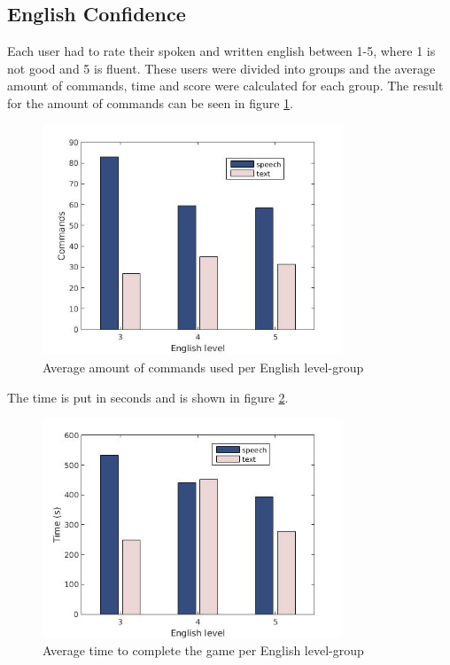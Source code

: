 \subsection{English Confidence} \label{sec:eng_con}
Each user had to rate their spoken and written english between 1-5, where 1 is not good and 5 is fluent. These users were divided into groups and the average amount of commands, time and score were calculated for each group. The result for the amount of commands can be seen in figure \ref{eng_cmd}. 
\begin{figure}[ht]
  \centering
  \includegraphics[width=0.8\textwidth]{images/english_cmd.jpg}
  \caption{Average amount of commands used per English level-group}\label{eng_cmd}
\end{figure}
The time is put in seconds and is shown in figure \ref{eng_time}.
\begin{figure}[ht]
  \centering
  \includegraphics[width=0.8\textwidth]{images/english_time.jpg}
  \caption{Average time to complete the game per English level-group}\label{eng_time}
\end{figure}
